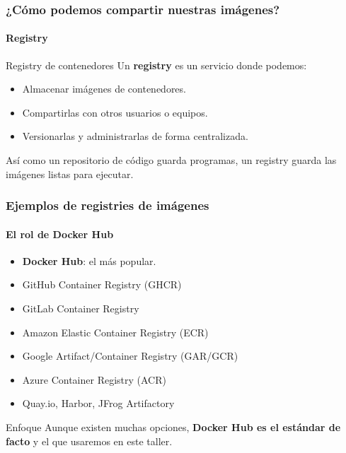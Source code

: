 \begin{frame}
    \frametitle{¿Cómo podemos compartir nuestras imágenes?}
    \framesubtitle{Registry}

    \begin{block}{Registry de contenedores}
        Un \textbf{registry} es un servicio donde podemos:
        \begin{itemize}
            \item Almacenar imágenes de contenedores.
            \item Compartirlas con otros usuarios o equipos.
            \item Versionarlas y administrarlas de forma centralizada.
        \end{itemize}
        Así como un repositorio de código guarda programas, 
        un registry guarda las imágenes listas para ejecutar.
    \end{block}
\end{frame}


\begin{frame}
    \frametitle{Ejemplos de registries de imágenes}
    \framesubtitle{El rol de Docker Hub}

    \begin{itemize}
        \item \textbf{Docker Hub}: el más popular.
        \pause
        \item GitHub Container Registry (GHCR)
        \item GitLab Container Registry
        \item Amazon Elastic Container Registry (ECR)
        \item Google Artifact/Container Registry (GAR/GCR)
        \item Azure Container Registry (ACR)
        \item Quay.io, Harbor, JFrog Artifactory
    \end{itemize}

    \begin{block}{Enfoque}
        Aunque existen muchas opciones,
        \textbf{Docker Hub es el estándar de facto} y el que usaremos en este taller.
    \end{block}
\end{frame}


